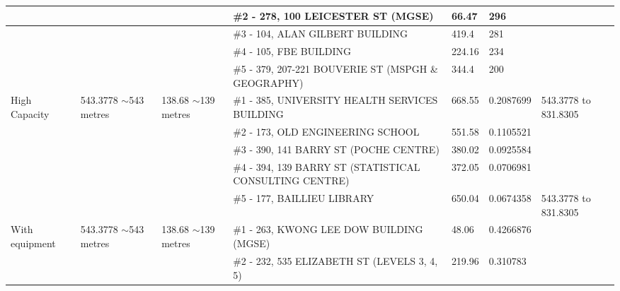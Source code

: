 \begin{table}[H]
{\begin{tabular}{|l|l|l|l|l|l|l|}
                        &                           &                          & \#2 - 278, 100 LEICESTER ST (MGSE)                      & 66.47         & 296             &                           \\ \hline
                        &                           &                          & \#3 - 104, ALAN GILBERT BUILDING                        & 419.4         & 281             &                           \\ \hline
                        &                           &                          & \#4 - 105, FBE BUILDING                                 & 224.16        & 234             &                           \\ \hline
                        &                           &                          & \#5 - 379, 207-221 BOUVERIE ST (MSPGH \& GEOGRAPHY)     & 344.4         & 200             &                           \\ \hline
High Capacity           & 543.3778 $\sim$543 metres & 138.68 $\sim$139 metres  & \#1 - 385, UNIVERSITY HEALTH SERVICES BUILDING          & 668.55        & 0.2087699       & 543.3778 to 831.8305      \\ \hline
                        &                           &                          & \#2 - 173, OLD ENGINEERING SCHOOL                       & 551.58        & 0.1105521       &                           \\ \hline
                        &                           &                          & \#3 - 390, 141 BARRY ST (POCHE CENTRE)                  & 380.02        & 0.0925584       &                           \\ \hline
                        &                           &                          & \#4 - 394, 139 BARRY ST (STATISTICAL CONSULTING CENTRE) & 372.05        & 0.0706981       &                           \\ \hline
                        &                           &                          & \#5 - 177, BAILLIEU LIBRARY                             & 650.04        & 0.0674358       & 543.3778 to 831.8305      \\ \hline
With equipment         & 543.3778 $\sim$543 metres & 138.68 $\sim$139 metres  & \#1 - 263, KWONG LEE DOW BUILDING (MGSE)                & 48.06         & 0.4266876       &                           \\ \hline
                        &                           &                          & \#2 - 232, 535 ELIZABETH ST (LEVELS 3, 4, 5)            & 219.96        & 0.310783        &                           \\ \hline

\end{tabular}}
\end{table}
